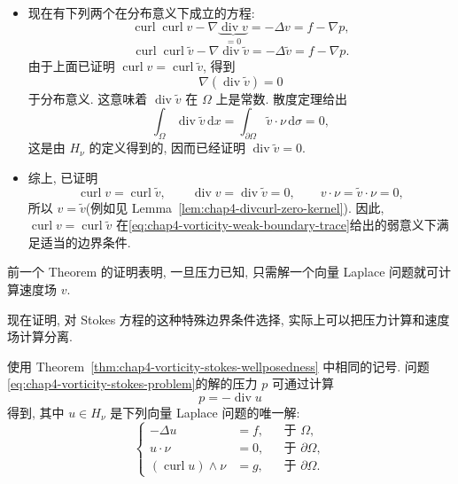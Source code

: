 \begin{Proof}
\begin{itemize}
\item 现在有下列两个在分布意义下成立的方程:
\[
 \operatorname{curl}\operatorname{curl}v-\nabla\underbrace{\operatorname{div}v}_{=0}
 =-\Delta v=f-\nabla p,
\]
\[
 \operatorname{curl}\operatorname{curl}\widetilde v-\nabla\operatorname{div}\widetilde v
 =-\Delta\widetilde v=f-\nabla p.
\]
由于上面已证明 $\operatorname{curl}v=\operatorname{curl}\widetilde v$, 得到
\[
 \nabla(\operatorname{div}\widetilde v)=0
\]
于分布意义. 这意味着 $\operatorname{div}\widetilde v$ 在 $\Omega$ 上是常数. 散度定理给出
\[
 \int_\Omega\operatorname{div}\widetilde v\,\mathrm dx
 =\int_{\partial\Omega}\widetilde v\cdot\nu\,\mathrm d\sigma=0,
\]
这是由 $H_\nu$ 的定义得到的, 因而已经证明 $\operatorname{div}\widetilde v=0$.

\item 综上, 已证明
\[
 \operatorname{curl}v=\operatorname{curl}\widetilde v,
 \qquad\operatorname{div}v=\operatorname{div}\widetilde v=0,
 \qquad v\cdot\nu=\widetilde v\cdot\nu=0,
\]
所以 $v=\widetilde v$(例如见 Lemma~\ref{lem:chap4-divcurl-zero-kernel}). 因此, $\operatorname{curl}v=\operatorname{curl}\widetilde v$ 在\eqref{eq:chap4-vorticity-weak-boundary-trace}给出的弱意义下满足适当的边界条件.
\end{itemize}
\end{Proof}

前一个 Theorem 的证明表明, 一旦压力已知, 只需解一个向量 Laplace 问题就可计算速度场 $v$.

现在证明, 对 Stokes 方程的这种特殊边界条件选择, 实际上可以把压力计算和速度场计算分离.

\begin{Proposition}
\label{prop:chap4-vorticity-pressure-decoupling}
使用 Theorem~\ref{thm:chap4-vorticity-stokes-wellposedness} 中相同的记号. 问题\eqref{eq:chap4-vorticity-stokes-problem}的解的压力 $p$ 可通过计算
\[
 p=-\operatorname{div}u
\]
得到, 其中 $u\in H_\nu$ 是下列向量 Laplace 问题的唯一解:
\begin{equation}
 \left\{
 \begin{aligned}
  -\Delta u&=f,&&\text{于 }\Omega,\\
  u\cdot\nu&=0,&&\text{于 }\partial\Omega,\\
  (\operatorname{curl}u)\wedge\nu&=g,&&\text{于 }\partial\Omega.
 \end{aligned}
 \right.
 \label{eq:chap4-vorticity-pressure-laplace}
\end{equation}
\end{Proposition}

